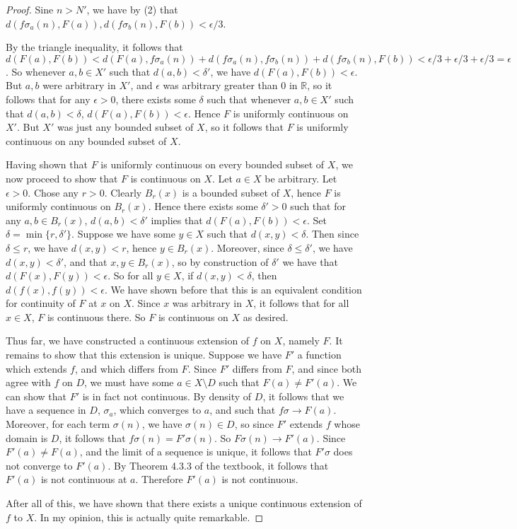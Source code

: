 \documentclass[11pt]{article}
\newcommand{\R}{\mathbb{R}}
\theoremstyle{definition}
\begin{document}
\begin{proof}
Sine $n> N'$, we have by (2) that $d(f\sigma_a(n) , F(a)), d(f\sigma_b(n), F(b)) < \epsilon /3$. 

By the triangle inequality, it follows that $ d(F(a), F(b) ) < d(F(a) , f\sigma_a(n)) + d(f\sigma_a(n) , f\sigma_b(n) ) + d(f\sigma_b(n) , F(b)) < \epsilon/3 + \epsilon/3 + \epsilon /3 = \epsilon$. So whenever $a,b\in X'$ such that $ d(a,b) < \delta' $, we have $ d(F(a), F(b)) < \epsilon $. But $a,b$ were arbitrary in $X'$, and $\epsilon$ was arbitrary greater than $0$ in $\R$, so it follows that for any $\epsilon > 0$, there exists some $\delta$ such that whenever $a,b\in X'$ such that $d(a,b) < \delta$, $d(F(a), F(b)) < \epsilon$. Hence $F$ is uniformly continuous on $X'$. But $X'$ was just any bounded subset of $X$, so it follows that $F$ is uniformly continuous on any bounded subset of $X$.


Having shown that $F$ is uniformly continuous on every bounded subset of $X$, we now proceed to show that $F$ is continuous on $X$. Let $a\in X$ be arbitrary. Let $\epsilon > 0$. Chose any $r>0$. Clearly $ B_r(x)$ is a bounded subset of $X$, hence $F$ is uniformly continuous on $B_r(x)$. Hence there exists some $\delta' > 0$ such that for any $a,b\in B_r(x)$, $ d(a,b) < \delta' $ implies that $ d(F(a), F(b)) < \epsilon $. Set $\delta = \min\{r, \delta'\}$. Suppose we have some $y\in X$ such that $ d(x,y) < \delta $. Then since $ \delta \le r $, we have $d(x,y) < r$, hence $y\in B_r(x)$. Moreover, since $\delta \le \delta'$, we have $ d(x,y) < \delta' $, and that $ x,y\in B_r(x)$, so by construction of $\delta'$ we have that $ d(F(x), F(y)) < \epsilon $. So for all $y\in X$, if $d(x,y) < \delta$, then $d(f(x), f(y)) < \epsilon$. We have shown before that this is an equivalent condition for continuity of $F$ at $x$ on $X$. Since $x$ was arbitrary in $X$, it follows that for all $x\in X$, $F$ is continuous there. So $F$ is continuous on $X$ as desired.


Thus far, we have constructed a continuous extension of $f$ on $X$, namely $F$. It remains to show that this extension is unique. Suppose we have $F'$ a function which extends $f$, and which differs from $F$. Since $F'$ differs from $F$, and since both agree with $f$ on $D$, we must have some $a\in X\setminus D$ such that $ F(a) \ne F'(a) $. We can show that $F'$ is in fact not continuous. By density of $D$, it follows that we have a sequence in $D$, $\sigma_a$, which converges to $a$, and such that $f\sigma\to F(a)$. Moreover, for each term $\sigma(n)$, we have $\sigma(n)\in D$, so since $F'$ extends $f$ whose domain is $D$, it follows that $f\sigma(n) = F'\sigma(n)$. So $F\sigma(n) \to F'(a)$. Since $F'(a) \ne F(a)$, and the limit of a sequence is unique, it follows that $F'\sigma$ does not converge to $F'(a)$. By Theorem 4.3.3 of the textbook, it follows that $F'(a)$ is not continuous at $a$. Therefore $F'(a)$ is not continuous.  

After all of this, we have shown that there exists a unique continuous extension of $f$ to $X$. In my opinion, this is actually quite remarkable.

\end{proof}
\end{document}
